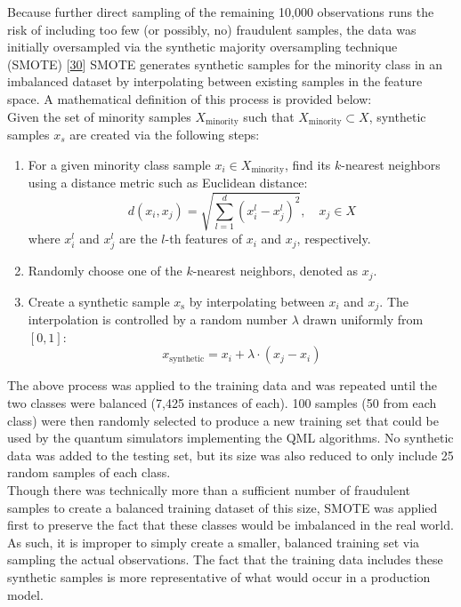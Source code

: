 \documentclass[11pt, oneside]{article}   	%
\begin{document}
Because further direct sampling of the remaining 10,000 observations runs the risk of including too few (or possibly, no) fraudulent samples, the data was initially oversampled via the synthetic majority oversampling technique (SMOTE) [\href{https://doi.org/10.1613/jair.953}{30}] SMOTE generates synthetic samples for the minority class in an imbalanced dataset by interpolating between existing samples in the feature space. A mathematical definition of this process is provided below:\\

Given the set of minority samples $X_{\text{minority}}$ such that $X_{\text{minority}} \subset X$, synthetic samples $x_s$ are created via the following steps:


\begin{enumerate}
    \item For a given minority class sample $x_i \in X_{\text{minority}}$, find its $k$-nearest neighbors using a distance metric such as Euclidean distance:
    	\begin{equation}
         d(x_i, x_j) = \sqrt{\sum_{l=1}^d (x_i^l - x_j^l)^2}, \quad x_j \in X
    	\end{equation}
    where $x_i^l$ and $x_j^l$ are the $l $-th features of $x_i$ and $ x_j$, respectively.
    \item Randomly choose one of the $k$-nearest neighbors, denoted as $x_j$.
    \item Create a synthetic sample $x_{\text{s}}$ by interpolating between $x_i$ and $x_j$. The interpolation is controlled by a random number $\lambda$ drawn uniformly from $[0, 1]$:
    	\begin{equation}
    	x_{\text{synthetic}} = x_i + \lambda \cdot (x_j - x_i)
   	\end{equation}
\end{enumerate}

The above process was applied to the training data and was repeated until the two classes were balanced (7,425 instances of each). 100 samples (50 from each class) were then randomly selected to produce a new training set that could be used by the quantum simulators implementing the QML algorithms. No synthetic data was added to the testing set, but its size was also reduced to only include 25 random samples of each class.\\

Though there was technically more than a sufficient number of fraudulent samples to create a balanced training dataset of this size, SMOTE was applied first to preserve the fact that these classes would be imbalanced in the real world. As such, it is improper to simply create a smaller, balanced training set via sampling the actual observations. The fact that the training data includes these synthetic samples is more representative of what would occur in a production model. \\
\end{document}
